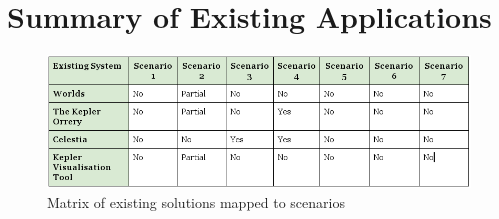 \section{Summary of Existing Applications}
\begin{figure}[H]
  \centering
      \includegraphics[width=1\textwidth]{images/existing.png}
  \caption{Matrix of existing solutions mapped to scenarios}  
    \label{fig:existing}
\end{figure}


